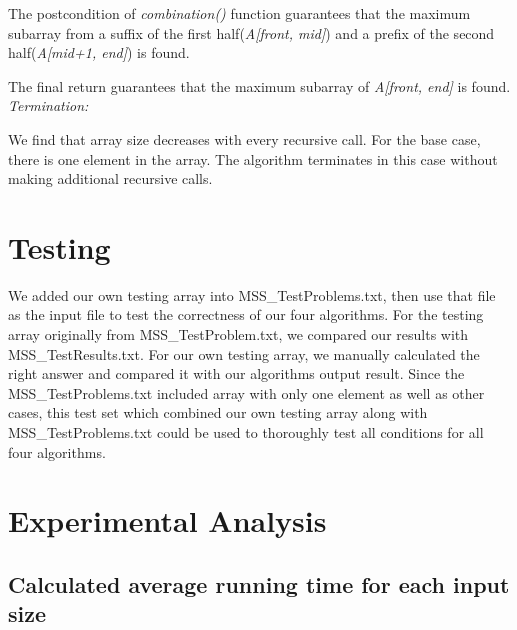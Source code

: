 \documentclass[11pt]{scrreprt}
\begin{document}
The postcondition of \textit{combination()} function guarantees that the maximum subarray from a suffix of the first half(\textit{A[front, mid]}) and a prefix of the second half(\textit{A[mid+1, end]}) is found.

The final return guarantees that the maximum subarray of \textit{A[front, end]} is found. \\
\emph{Termination:}

We find that array size decreases with every recursive call. For the base case, there is one element in the array. The algorithm terminates in this case without making additional recursive calls.


\chapter{Testing}

We added our own testing array into MSS\_TestProblems.txt, then use that file as the input file to test the correctness of our four algorithms. For the testing array originally from MSS\_TestProblem.txt, we compared our results with MSS\_TestResults.txt. For our own testing array, we manually calculated the right answer and compared it with our algorithms output result. Since the MSS\_TestProblems.txt included array with only one element as well as other cases, this test set which combined our own testing array along with MSS\_TestProblems.txt could be used to thoroughly test all conditions for all four algorithms.

\chapter{Experimental Analysis}

\section {Calculated average running time for each input size}
\end{document}
